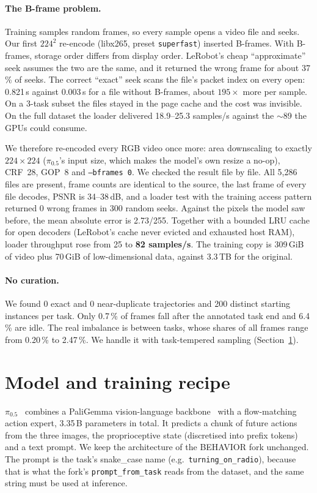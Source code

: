 \documentclass[10pt]{article}
\newcommand{\pizf}{$\pi_{0.5}$}
\begin{document}
\paragraph{The B-frame problem.} Training samples random frames, so every sample opens a video file and seeks. Our
first $224^2$ re-encode (libx265, preset \texttt{superfast}) inserted B-frames. With B-frames, storage order differs
from display order. LeRobot's cheap ``approximate'' seek assumes the two are the same, and it returned the wrong
frame for about 37\,\% of seeks. The correct ``exact'' seek scans the file's packet index on every open: 0.821\,s
against 0.003\,s for a file without B-frames, about $195\times$ more per sample. On a 3-task subset the files stayed
in the page cache and the cost was invisible. On the full dataset the loader delivered 18.9--25.3 samples/s against
the $\sim$89 the GPUs could consume.

We therefore re-encoded every RGB video once more: area downscaling to exactly $224\times224$ (\pizf{}'s input size,
which makes the model's own resize a no-op), CRF~28, GOP~8 and \texttt{--bframes 0}. We checked the result file by
file. All 5{,}286 files are present, frame counts are identical to the source, the last frame of every file decodes,
PSNR is 34--38\,dB, and a loader test with the training access pattern returned 0 wrong frames in 300 random seeks.
Against the pixels the model saw before, the mean absolute error is 2.73/255. Together with a bounded LRU cache for
open decoders (LeRobot's cache never evicted and exhausted host RAM), loader throughput rose from 25 to
\textbf{82 samples/s}. The training copy is 309\,GiB of video plus 70\,GiB of low-dimensional data, against 3.3\,TB for
the original.

\paragraph{No curation.} We found 0 exact and 0 near-duplicate trajectories and 200 distinct starting instances per
task. Only 0.7\,\% of frames fall after the annotated task end and 6.4\,\% are idle. The real imbalance is between
tasks, whose shares of all frames range from 0.20\,\% to 2.47\,\%. We handle it with task-tempered sampling
(Section~\ref{sec:recipe}).

\section{Model and training recipe}
\label{sec:recipe}
\pizf{}~\cite{pi05} combines a PaliGemma vision-language backbone~\cite{paligemma} with a flow-matching~\cite{flowmatching}
action expert, 3.35\,B parameters in total. It predicts a chunk of future actions from the three images, the proprioceptive state (discretised into prefix tokens) and a text prompt. We keep the architecture of the BEHAVIOR fork
unchanged. The prompt is the task's snake\_case name (e.g.\ \texttt{turning\_on\_radio}), because that is what the
fork's \texttt{prompt\_from\_task} reads from the dataset, and the same string must be used at inference.
\end{document}

